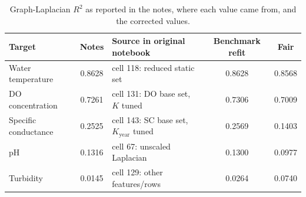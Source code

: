 \documentclass[11pt]{article}
\begin{document}
\begin{table}[h]
\centering
\small
\caption{Graph-Laplacian $R^2$ as reported in the notes, where each value came from, and the
corrected values.}
\label{tab:notes}
\begin{tabular}{lS l S S}
\toprule
Target & {Notes} & Source in original notebook & {Benchmark refit} & {Fair} \\
\midrule
Water temperature    & 0.8628 & cell 118: reduced static set& 0.8628 & 0.8568 \\
DO concentration     & 0.7261 & cell 131: DO base set, $K$ tuned& 0.7306 & 0.7009 \\
Specific conductance & 0.2525 & cell 143: SC base set, $K_{\text{year}}$ tuned & 0.2569 & 0.1403 \\
pH                   & 0.1316 & cell 67: unscaled Laplacian& 0.1300 & 0.0977 \\
Turbidity            & 0.0145 & cell 129: other features/rows& 0.0264 & 0.0740 \\
\bottomrule
\end{tabular}
\end{table}
\end{document}
